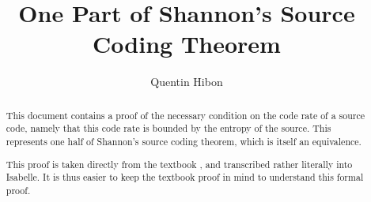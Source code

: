 \documentclass[11pt,a4paper]{article}
\begin{document}
\title{One Part of Shannon's Source Coding Theorem}
\author{Quentin Hibon}
\maketitle

\begin{abstract}
  This document contains a proof of the necessary condition on the code rate of
  a source code, namely that this code rate is bounded by the entropy of the
  source. This represents one half of Shannon's source coding theorem, which is
  itself an equivalence.

  This proof is taken directly from the textbook \cite{ref},
  and transcribed rather literally into Isabelle. It is thus easier to keep the
  textbook proof in mind to understand this formal proof.
\end{abstract}

\tableofcontents





\end{document}
